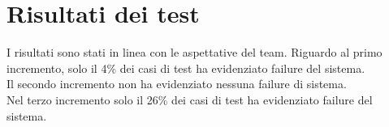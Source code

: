 \chapter{Risultati dei test}
I risultati sono stati in linea con le aspettative del team.
Riguardo al primo incremento, solo il 4\% dei casi di test ha evidenziato failure del sistema.\\
Il secondo incremento non ha evidenziato nessuna failure di sistema.\\
Nel terzo incremento solo il 26\% dei casi di test ha evidenziato failure del sistema.
